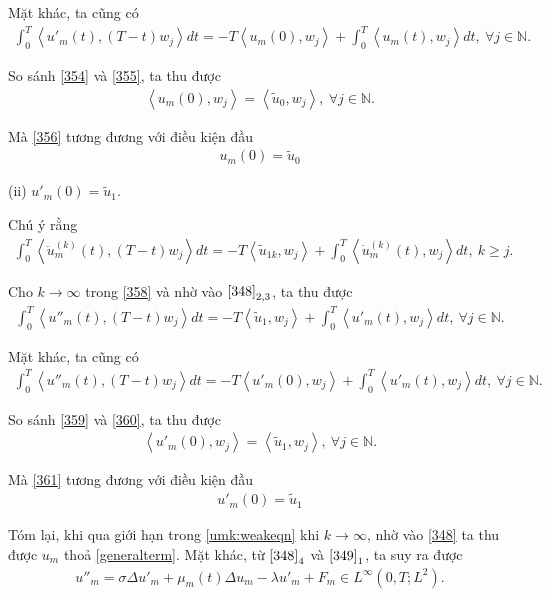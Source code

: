 \documentclass[12pt,a4paper]{article}
\def\N{\mathbb{N}}
\theoremstyle{definition}
\theoremstyle{definition}
\begin{document}
Mặt khác, ta cũng có
\begin{align} \label{355}
    \int_0^T \left<u'_m(t), (T-t)w_j\right> dt = -T \left<u_m(0), w_j\right> + \int_0^T \left<u_m(t), w_j\right> dt,\ \forall j \in \N.
\end{align}

So sánh \eqref{354} và \eqref{355}, ta thu được
\begin{align} \label{356}
    \left<u_m(0), w_j\right> = \left<\tilde{u}_0, w_j\right>,\ \forall j \in \N.
\end{align}

Mà \eqref{356} tương đương với điều kiện đầu
\begin{align}
    u_m(0) = \tilde{u}_0
\end{align}

(ii) $u'_m(0) = \tilde{u}_1$.

Chú ý rằng
\begin{align} \label{358}
    \int_0^T \left<\ddot{u}_m^{(k)}(t), (T-t)w_j\right> dt = -T \left<\tilde{u}_{1k}, w_j\right> + \int_0^T \left<\dot{u}_m^{(k)}(t), w_j\right> dt,\ k \ge j.
\end{align}

Cho $k \to \infty$ trong \eqref{358} và nhờ vào $\eqref{348}_{2,3}$, ta thu được
\begin{align} \label{359}
    \int_0^T \left<u''_m(t), (T-t)w_j\right> dt = -T \left<\tilde{u}_{1}, w_j\right> + \int_0^T \left<u'_m(t), w_j\right> dt,\ \forall j \in \N.
\end{align}

Mặt khác, ta cũng có
\begin{align} \label{360}
   \int_0^T \left<u''_m(t), (T-t)w_j\right> dt = -T \left<u'_m(0), w_j\right> + \int_0^T \left<u'_m(t), w_j\right> dt,\ \forall j \in \N.
\end{align}

So sánh \eqref{359} và \eqref{360}, ta thu được
\begin{align} \label{361}
    \left<u'_m(0), w_j\right> = \left<\tilde{u}_{1}, w_j\right>,\ \forall j \in \N.
\end{align}

Mà \eqref{361} tương đương với điều kiện đầu
\begin{align}
    u'_m(0) = \tilde{u}_1
\end{align}

Tóm lại, khi qua giới hạn trong \eqref{umk:weakeqn} khi $k \to \infty$, nhờ vào \eqref{348} ta thu được $u_m$ thoả \eqref{generalterm}. Mặt khác, từ $\eqref{348}_4$ và $\eqref{349}_1$, ta suy ra được
\begin{align}
    u''_m = \sigma \Delta u'_m + \mu_m(t) \Delta u_m - \lambda u'_m + F_m \in L^\infty(0,T;L^2).
\end{align}
\end{document}
